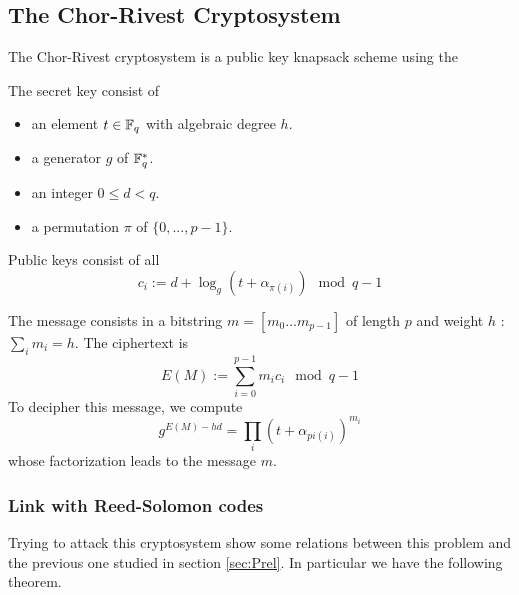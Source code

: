 \documentclass[12pt,a4paper,titlepage]{article}
\newcommand{\GF}[1]{\F_{#1}}
\begin{document}
\subsection{The Chor-Rivest Cryptosystem}

The Chor-Rivest cryptosystem is a public key knapsack scheme using the 


The secret key consist of
\begin{itemize}
\item an element $t \in \GF{q}$ with algebraic degree $h$.
\item a generator $g$ of $\GF{q}^{*}$.
\item an integer $0 \leq d < q$.
\item a permutation $\pi$ of $\{ 0, ... , p-1 \}$.
\end{itemize}

Public keys consist of all
$$ c_i := d + \log_g(t + \alpha_{\pi(i)}) \mod q-1 $$

The message consists in a bitstring $m = [m_0...m_{p-1}]$ of length $p$ and weight $h$ : $\sum_i m_i = h$. The ciphertext is
$$ E(M) := \sum_{i=0}^{p-1} m_i c_i \mod q-1 $$
To decipher this message, we compute
$$ g^{E(M) - hd} =  \prod_i \left( t + \alpha_{pi(i)}\right)^{m_i} $$
whose factorization leads to the message $m$.


\subsubsection{Link with Reed-Solomon codes}

Trying to attack this cryptosystem show some relations between this problem and the previous one studied in section \ref{sec:Prel}. In particular we have the following theorem.
\end{document}
